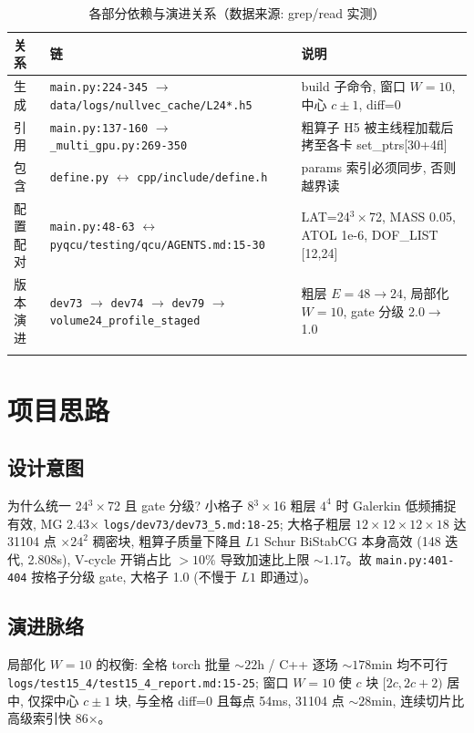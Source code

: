 \documentclass[UTF8]{ctexart}
\begin{document}
\begin{xltabular}{\textwidth}{llX}
\toprule
关系 & 链 & 说明 \\
\midrule
\endhead
生成 & \texttt{\nolinkurl{main.py:224-345}} $\to$ \texttt{\nolinkurl{data/logs/nullvec_cache/L24*.h5}} & build 子命令, 窗口 $W=10$, 中心 $c\pm1$, diff=0 \\
引用 & \texttt{\nolinkurl{main.py:137-160}} $\to$ \texttt{\nolinkurl{_multi_gpu.py:269-350}} & 粗算子 H5 被主线程加载后拷至各卡 set\_ptrs[30+4fl] \\
包含 & \texttt{\nolinkurl{define.py}} $\leftrightarrow$ \texttt{\nolinkurl{cpp/include/define.h}} & params 索引必须同步, 否则越界读 \\
配置配对 & \texttt{\nolinkurl{main.py:48-63}} $\leftrightarrow$ \texttt{\nolinkurl{pyqcu/testing/qcu/AGENTS.md:15-30}} & LAT=24$^3\times$72, MASS 0.05, ATOL 1e-6, DOF\_LIST [12,24] \\
版本演进 & \texttt{\nolinkurl{dev73}} $\to$ \texttt{\nolinkurl{dev74}} $\to$ \texttt{\nolinkurl{dev79}} $\to$ \texttt{\nolinkurl{volume24_profile_staged}} & 粗层 $E=48\to24$, 局部化 $W=10$, gate 分级 2.0$\to$1.0 \\
\bottomrule
\caption{各部分依赖与演进关系（数据来源: grep/read 实测）}
\end{xltabular}

\section{项目思路}
\subsection{设计意图}
\textcolor{idea}{为什么统一 24$^3\times$72 且 gate 分级?} 小格子 8$^3\times$16 粗层 $4^4$ 时 Galerkin 低频捕捉有效, MG 2.43$\times$ \textcolor{evidence}{\texttt{\nolinkurl{logs/dev73/dev73_5.md:18-25}}}; 大格子粗层 $12\times12\times12\times18$ 达 31104 点 $\times 24^2$ 稠密块, 粗算子质量下降且 $L1$ Schur BiStabCG 本身高效 (148 迭代, 2.808s), V-cycle 开销占比 $>10\%$ 导致加速比上限 $\sim1.17$。故 \texttt{\nolinkurl{main.py:401-404}} 按格子分级 gate, 大格子 1.0 (不慢于 $L1$ 即通过)。

\subsection{演进脉络}
\textcolor{idea}{局部化 $W=10$ 的权衡:} 全格 torch 批量 $\sim22$h / C++ 逐场 $\sim178$min 均不可行 \textcolor{evidence}{\texttt{\nolinkurl{logs/test15_4/test15_4_report.md:15-25}}}; 窗口 $W=10$ 使 $c$ 块 $[2c,2c+2)$ 居中, 仅探中心 $c\pm1$ 块, 与全格 diff=0 且每点 54ms, 31104 点 $\sim28$min, 连续切片比高级索引快 86$\times$。
\end{document}
